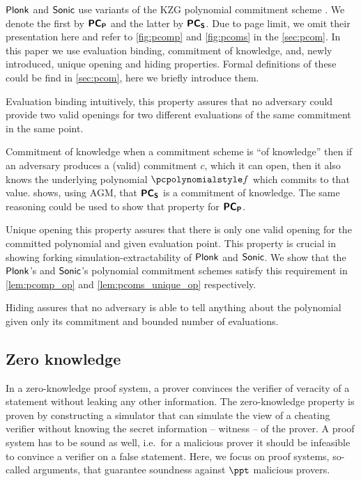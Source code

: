 \documentclass[runningheads,11pt]{llncs}
\begin{document}
$\textnormal{\textsf{Plonk}}$ and ${\textnormal{\textsf{Sonic}}}$ use variants of the KZG polynomial commitment scheme
\cite{AC:KatZavGol10}. We denote the first by $\bm{\mathsf{PC}}_{\bm{\mathsf{P}}}$ and the latter by
$\bm{\mathsf{PC}}_{\bm{\mathsf{S}}}$. Due to page limit, we omit their presentation here and refer to
\cref{fig:pcomp} and \cref{fig:pcoms} in the \cref{sec:pcom}.  In this paper we
use evaluation binding, commitment of knowledge, and, newly introduced, unique
opening and hiding properties. Formal definitions of these could be find in
\cref{sec:pcom}, here we briefly introduce them.
\begin{compactdesc}
  \item[Evaluation binding] intuitively, this property assures that no adversary
    could provide two valid openings for two different evaluations of the same
    commitment in the same point. 
  \item[Commitment of knowledge] when a commitment scheme is ``of
    knowledge'' then if an adversary produces a (valid) commitment $c$, which it
    can open, then it also knows the underlying polynomial $\p{f}$ which commits
    to that value.  \cite{CCS:MBKM19} shows, using AGM, that $\bm{\mathsf{PC}}_{\bm{\mathsf{S}}}$ is a
    commitment of knowledge.  The same reasoning could be used to show that
    property for $\bm{\mathsf{PC}}_{\bm{\mathsf{P}}}$.
  \item[Unique opening] this property assures that there is
    only one valid opening for the committed polynomial and given evaluation
    point. This property is crucial in showing forking simulation-extractability
    of $\textnormal{\textsf{Plonk}}$ and ${\textnormal{\textsf{Sonic}}}$. We show that the $\textnormal{\textsf{Plonk}}$'s and ${\textnormal{\textsf{Sonic}}}$'s
    polynomial commitment schemes satisfy this requirement in
    \cref{lem:pcomp_op} and \cref{lem:pcoms_unique_op} respectively.
  \item[Hiding] assures that no adversary is able to tell anything about the
    polynomial given only its commitment and bounded number of evaluations.
\end{compactdesc}


\subsection{Zero knowledge}
In a zero-knowledge proof system, a prover convinces the verifier of veracity of a statement
without leaking any other information. The zero-knowledge property is proven by constructing a
simulator that can simulate the view of a cheating verifier without knowing the secret
information -- witness -- of the prover. A proof system has to be sound as well, i.e.~for a
malicious prover it should be infeasible to convince a verifier on a false statement. Here, we
focus on proof systems, so-called arguments, that guarantee soundness against $\ppt$ malicious provers.
\end{document}
